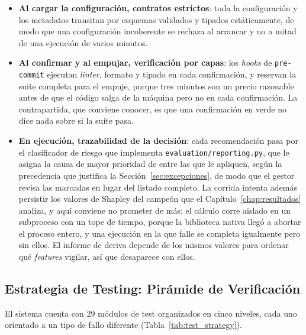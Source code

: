 \begin{itemize}
    \item \textbf{Al cargar la configuración, contratos estrictos}: toda la configuración y los metadatos transitan por esquemas validados y tipados estáticamente, de modo que una configuración incoherente se rechaza al arrancar y no a mitad de una ejecución de varios minutos.
    \item \textbf{Al confirmar y al empujar, verificación por capas}: los \textit{hooks} de \texttt{pre-commit} ejecutan \textit{linter}, formato y tipado en cada confirmación, y reservan la suite completa para el empuje, porque tres minutos son un precio razonable antes de que el código salga de la máquina pero no en cada confirmación. La contrapartida, que conviene conocer, es que una confirmación en verde no dice nada sobre si la suite pasa.
    \item \textbf{En ejecución, trazabilidad de la decisión}: cada recomendación pasa por el clasificador de riesgo que implementa \texttt{evaluation/}\allowbreak\texttt{reporting.py}, que le asigna la causa de mayor prioridad de entre las que le apliquen, según la precedencia que justifica la Sección~\ref{sec:excepciones}, de modo que el gestor revisa las marcadas en lugar del listado completo. La corrida intenta además persistir los valores de Shapley del campeón que el Capítulo~\ref{chap:resultados} analiza, y aquí conviene no prometer de más: el cálculo corre aislado en un subproceso con un tope de tiempo, porque la biblioteca nativa llegó a abortar el proceso entero, y una ejecución en la que falle se completa igualmente pero sin ellos. El informe de deriva depende de los mismos valores para ordenar qué \textit{features} vigilar, así que desaparece con ellos.
\end{itemize}

\subsection{Estrategia de Testing: Pirámide de Verificación}
\label{sec:testing}

El sistema cuenta con 29 módulos de test organizados en cinco niveles, cada uno orientado a un tipo de fallo diferente (Tabla~\ref{tab:test_strategy}).

